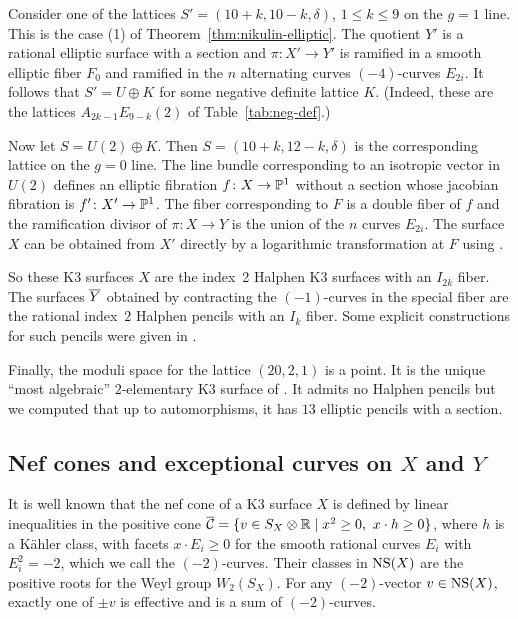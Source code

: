 \documentclass{amsart}
\begin{document}
Consider one of the lattices %
$S'=(10+k,10-k,\delta)$, $1\le k\le 9$ 
on the $g=1$ line. This is the case (1) of
Theorem~\ref{thm:nikulin-elliptic}. The quotient $Y'$ is a rational
elliptic surface with a section and $\pi\colon X'\to Y'$ is ramified in
a smooth elliptic fiber $F_0$ and ramified in the $n$ alternating
curves $(-4)$-curves $E_{2i}$. It follows that $S'=U\oplus K$ for some
negative definite lattice $K$. (Indeed, these are the lattices
$A_{2k-1}E_{9-k}(2)$ of Table~\ref{tab:neg-def}.)

Now let $S=U(2)\oplus K$. Then %
$S=(10+k,12-k,\delta)$
is the corresponding
lattice on the $g=0$ line. The line bundle corresponding to an
isotropic vector in $U(2)$ defines an elliptic fibration
$f\colon X\to{\mathbb P}^1$ without a section whose jacobian fibration is
$f'\colon X'\to{\mathbb P}^1$. The fiber corresponding to $F$ is a double
fiber of $f$ and the ramification divisor of $\pi\colon X\to Y$ is
the union of the $n$ curves $E_{2i}$. The surface $X$ can be obtained
from $X'$ directly by a logarithmic transformation at $F$
using \cite[Cor.~5.4.7]{cossec1989enriques-surfaces}.

So these K3 surfaces $X$ are the index~2 Halphen K3 surfaces with an
$I_{2k}$ fiber. The surfaces ${\overline Y}$ obtained by contracting the
$(-1)$-curves in the special fiber
are the rational index~$2$ Halphen pencils with
an $I_k$ fiber. Some explicit constructions for such pencils were
given in \cite{kimura2018k3-surfaces, kimura2020sun-times,
  zanardini2020explicit-constructions}.

\smallskip

Finally, the moduli space for the lattice $(20,2,1)$ is a point. It is the
unique ``most algebraic'' $2$-elementary K3 surface of
\cite{vinberg1983two-most}. It admits no Halphen pencils but we
computed that up to automorphisms, it has $13$ elliptic pencils with a
section.



\subsection{Nef cones and exceptional curves on  $X$ and $Y$}
\label{sec:nef-XY}

It is well known that the nef cone of a K3 surface $X$ is
defined by linear inequalities in the positive cone
$\overline{{\mathcal C}}=\{v\in S_X\otimes{\mathbb R} \mid x^2\ge0, \ x\cdot h\ge0\}$, where $h$ is a
K\"ahler class, with facets $x\cdot E_i\ge0$ for the smooth
rational curves $E_i$ with $E_i^2=-2$, which we call the
$(-2)$-curves. Their classes in $\operatorname{NS}(X)$ are the positive roots for the
Weyl group $W_2(S_X)$.  For any $(-2)$-vector $v\in\operatorname{NS}(X)$, exactly one
of $\pm v$ is effective and is a sum of $(-2)$-curves.
\end{document}
